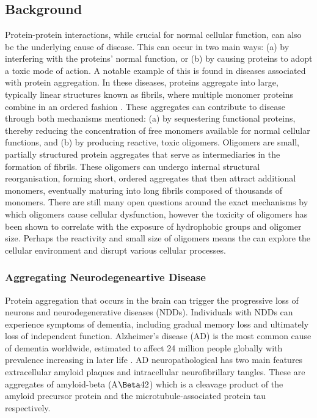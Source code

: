 \newcommand{\nc}[0]{n_{\mathrm{c}}}
\newcommand{\todo}[1]{{\color{red} [#1]}}

\chapter{\label{ch:4-aggregation}\chaggregation}

\minitoc

\section{Background}

Protein-protein interactions, while crucial for normal cellular function, can also be the underlying cause of disease. This can occur in two main ways: (a) by interfering with the proteins' normal function, or (b) by causing proteins to adopt a toxic mode of action. A notable example of this is found in diseases associated with protein aggregation. In these diseases, proteins aggregate into large, typically linear structures known as fibrils, where multiple monomer proteins combine in an ordered fashion \cite{chiti_protein_2006}. These aggregates can contribute to disease through both mechanisms mentioned: (a) by sequestering functional proteins, thereby reducing the concentration of free monomers available for normal cellular functions, and (b) by producing reactive, toxic oligomers. \cite{chiti_protein_2006, chiti_protein_2017} Oligomers are small, partially structured protein aggregates that serve as intermediaries in the formation of fibrils. These oligomers can undergo internal structural reorganisation, forming short, ordered aggregates that then attract additional monomers, eventually maturing into long fibrils composed of thousands of monomers. There are still many open questions around the exact mechanisms by which oligomers cause cellular dysfunction, however the toxicity of oligomers has been shown to correlate with the exposure of hydrophobic groups and oligomer size. \cite{chiti_protein_2017} Perhaps the reactivity and small size of oligomers means the can explore the cellular environment and disrupt various cellular processes.

\subsection{Aggregating Neurodegeneartive Disease}\label{sec:4-humandisease}

Protein aggregation that occurs in the brain can trigger the progressive loss of neurons and neurodegenerative diseases (NDDs). Individuals with NDDs can experience symptoms of dementia, including gradual memory loss and ultimately loss of independent function. \cite{erkkinen_clinical_2018}  Alzheimer’s disease (AD) is the most common cause of dementia worldwide, estimated to affect 24 million people globally with prevalence increasing in later life \cite{reitz_epidemiology_2011}. AD neuropathological has two main features extracellular amyloid plaques and intracellular neurofibrillary tangles. These are aggregates of amyloid-beta (A$\Beta42$) which is a cleavage product of the amyloid precursor protein and the  microtubule-associated protein tau respectively.

